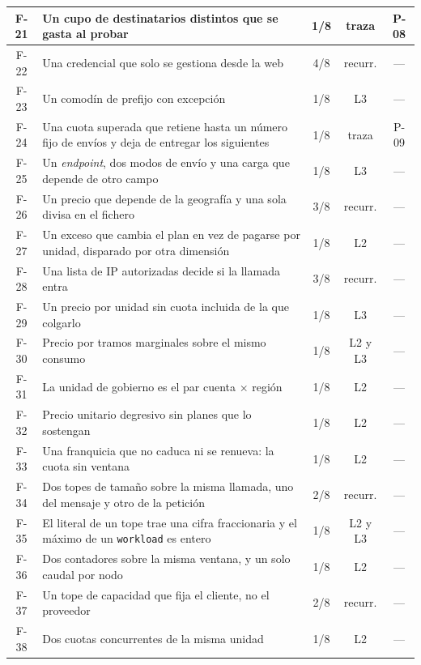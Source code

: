\begin{table}[tbp]
\begin{tabular}{|c|>{\raggedright\arraybackslash}p{}|c|c|c|}
\hline
F-21 & Un cupo de destinatarios distintos que se gasta al probar & 1/8 & traza & P-08 \\
\hline
F-22 & Una credencial que solo se gestiona desde la web & 4/8 & recurr. & --- \\
\hline
F-23 & Un comodín de prefijo con excepción & 1/8 & L3 & --- \\
\hline
F-24 & Una cuota superada que retiene hasta un número fijo de envíos y deja de entregar los siguientes & 1/8 & traza & P-09 \\
\hline
F-25 & Un \textit{endpoint}, dos modos de envío y una carga que depende de otro campo & 1/8 & L3 & --- \\
\hline
F-26 & Un precio que depende de la geografía y una sola divisa en el fichero & 3/8 & recurr. & --- \\
\hline
F-27 & Un exceso que cambia el plan en vez de pagarse por unidad, disparado por otra dimensión & 1/8 & L2 & --- \\
\hline
F-28 & Una lista de IP autorizadas decide si la llamada entra & 3/8 & recurr. & --- \\
\hline
F-29 & Un precio por unidad sin cuota incluida de la que colgarlo & 1/8 & L3 & --- \\
\hline
F-30 & Precio por tramos marginales sobre el mismo consumo & 1/8 & L2 y L3 & --- \\
\hline
F-31 & La unidad de gobierno es el par cuenta $\times$ región & 1/8 & L2 & --- \\
\hline
F-32 & Precio unitario degresivo sin planes que lo sostengan & 1/8 & L2 & --- \\
\hline
F-33 & Una franquicia que no caduca ni se renueva: la cuota sin ventana & 1/8 & L2 & --- \\
\hline
F-34 & Dos topes de tamaño sobre la misma llamada, uno del mensaje y otro de la petición & 2/8 & recurr. & --- \\
\hline
F-35 & El literal de un tope trae una cifra fraccionaria y el máximo de un \texttt{workload} es entero & 1/8 & L2 y L3 & --- \\
\hline
F-36 & Dos contadores sobre la misma ventana, y un solo caudal por nodo & 1/8 & L2 & --- \\
\hline
F-37 & Un tope de capacidad que fija el cliente, no el proveedor & 2/8 & recurr. & --- \\
\hline
F-38 & Dos cuotas concurrentes de la misma unidad & 1/8 & L2 & --- \\
\hline
\end{tabular}

\end{table}
